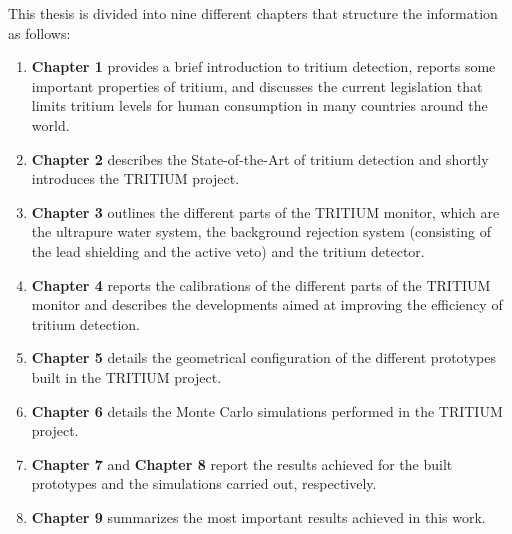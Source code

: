This thesis is divided into nine different chapters that structure the information as follows:

\begin{enumerate}
\item{} \textbf{Chapter 1} provides a brief introduction to tritium detection, reports some important properties of tritium, and discusses the current legislation that limits tritium levels for human consumption in many countries around the world. 

\item{} \textbf{Chapter 2} describes the State-of-the-Art of tritium detection and shortly introduces the TRITIUM project. 

\item{} \textbf{Chapter 3} outlines the different parts of the TRITIUM monitor, which are the ultrapure water system, the background rejection system (consisting of the lead shielding and the active veto)  and the tritium detector. 

\item{} \textbf{Chapter 4} reports the calibrations of the different parts of the TRITIUM monitor and describes the developments aimed at improving the efficiency of tritium detection. 

\item{} \textbf{Chapter 5} details the geometrical configuration of the different prototypes built in the TRITIUM project. 

\item{} \textbf{Chapter 6} details the Monte Carlo simulations performed in the TRITIUM project. 

\item {} \textbf{Chapter 7} and \textbf{Chapter 8} report the results  achieved for the built prototypes and the simulations carried out, respectively. 

\item{} \textbf{Chapter 9} summarizes the most important results achieved in this work.

\end{enumerate}

